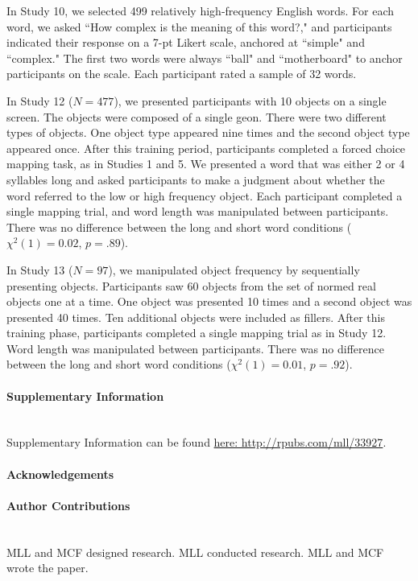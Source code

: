 \documentclass[12pt]{article}
\renewcommand\refname{References and Notes}
\begin{document}
In Study 10, we selected 499 relatively high-frequency English words. For each word, we asked ``How complex is the meaning of this word?," and participants indicated their response on a 7-pt Likert scale, anchored at ``simple" and ``complex." The first two words were always ``ball" and ``motherboard" to anchor participants on the scale. Each participant rated a sample of 32 words.

In Study 12 ($N = 477$), we presented participants with 10 objects on a single screen. The objects were composed of a single geon. There were two different types of objects. One object type appeared nine times and the second object type appeared once. After this training period, participants completed a forced choice mapping task, as in Studies 1 and 5. We presented a word that was either 2 or 4 syllables long and asked participants to make a judgment about whether the word referred to the low or high frequency object. Each participant completed a single mapping trial, and word length was manipulated between participants. There was no difference between the long and short word conditions ($\chi ^2(1) = 0.02$,  $p = .89$).

In Study 13 ($N = 97$), we manipulated object frequency by sequentially presenting objects. Participants saw 60 objects from the  set of normed real objects one at a time. One object was presented 10 times and a second object was presented 40 times. Ten additional objects were included as fillers. After this training phase, participants completed a single mapping trial as in Study 12. Word length was manipulated between participants. There was no difference between the long and short word conditions ($\chi ^2(1) = 0.01$,  $p = .92$).

\renewcommand{\refname}{\normalsize References}



\paragraph*{Supplementary Information}\mbox{}\\
Supplementary Information can be found \href{http://rpubs.com/mll/33927}{here: http://rpubs.com/mll/33927}.

\paragraph*{Acknowledgements}

\paragraph*{Author Contributions} \mbox{}\\
MLL and MCF designed research. MLL conducted research. MLL and MCF wrote the paper. 
\end{document}
